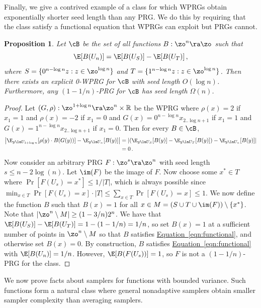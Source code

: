 \documentclass[11pt]{article}
\newcommand{\expeqref}[2]{\texorpdfstring{\hyperref[#2]{#1~\eqref{#2}}}{#1~\eqref{#2}}}
\newtheorem{proposition}[theorem]{Proposition}
\newcommand{\R}{{\mathbb R}}
\begin{document}
Finally, we give a contrived example of a class for which WPRGs obtain exponentially shorter seed length than any PRG. We do this by requiring that the class satisfy a functional equation that WPRGs can exploit but PRGs cannot.
\begin{proposition}
Let $\cB$ be the set of all functions $B:\zo^n\ra\zo$ such that 
\begin{equation}\label{eqn:functional}
    \E[B(U_n)] = \E[B(U_S)]-\E[B(U_T)]\,,  %
\end{equation}
where $S=\{0^{n-\log n}z:z\in \zo^{\log n}\}$ and $T=\{1^{n-\log n}z:z\in \zo^{\log n}\}$. Then there exists an explicit 0-WPRG for $\cB$ with seed length $O(\log n)$. Furthermore, any $(1-1/n)$-PRG for $\cB$ has seed length $\Omega(n)$.
\end{proposition}
\begin{proof}
Let $(G,\rho):\zo^{1+\log n}\ra\zo^n\times \R$ be the WPRG where $\rho(x)=2$ if $x_1=1$ and $\rho(x)=-2$ if $x_1=0$ and $G(x)=0^{n-\log n}x_{2..\log n+1}$ if $x_1=1$ and $G(x)=1^{n-\log n}x_{2..\log n+1}$ if $x_1=0$. Then for every $B\in \cB$,
\begin{align*}
    \left|\E_{y\la U_{1+\log n}}[\rho(y)\cdot B(G(y))] - \E_{y\la U_n}[B(y)]\right| &= \left|\left(\E_{y\la U_{S}}[B(y)]-\E_{y\la U_T}[B(y)]\right) - \E_{y\la U_n}[B(y)]\right|\\
    &= 0\,.     %
\end{align*}
Now consider an arbitrary PRG $F:\zo^s\ra\zo^n$ with seed length $s\leq n-2\log(n)$. Let $\im(F)$ be the image of $F$. Now choose some $x^*\in T$ where $\Pr[F(U_s)=x^*]\leq 1/|T|$, which is always possible since $\min_{x\in T}\Pr[F(U_s)=x]\cdot |T|\leq \sum_{x\in T}\Pr[F(U_s)=x]\leq 1$. We now define the function $B$ such that $B(x)=1$ for all $x\in M=(S\cup T \cup \im(F))\setminus \{x^*\}$. Note that $|\zo^n\setminus M| \geq (1-3/n)2^n$. %
We have that $\E[B(U_S)]-\E[B(U_T)]=1-(1-1/n)=1/n$, so set $B(x)=1$ at a sufficient number of points in $\zo^n\setminus M$ so that $B$ satisfies \expeqref{Equation}{eqn:functional}, and otherwise set $B(x)=0$. By construction, $B$ satisfies \expeqref{Equation}{eqn:functional} with $\E[B(U_n)]=1/n$. However, $\E[B(F(U_s))]=1$, so $F$ is not a $(1-1/n)$-PRG for the class.
\end{proof}

We now prove facts about samplers for functions with bounded variance. Such functions form a natural class where general nonadaptive samplers obtain smaller sampler complexity than averaging samplers.
\end{document}
